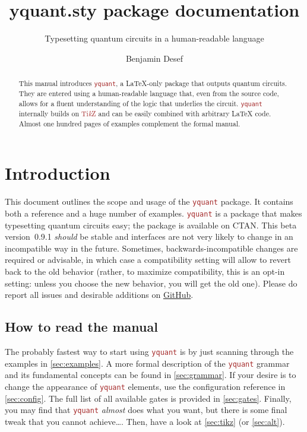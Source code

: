 \documentclass{scrartcl}
\title{yquant.sty package documentation}
\subtitle{Typesetting quantum circuits in a human-readable language}
\author{Benjamin Desef}
\makeatletter
\def\TikZ{\textcolor{brown}{Ti\textit kZ}}
\def\pkg#1{\textcolor{brown}{\texttt{#1}}}
\def\Yquant{\pkg{yquant}}
\newcommand*{\the@orig@section}{}
\let\the@orig@section=\section
\renewcommand*{\section}{%
   \clearpage%
   \the@orig@section%
}
\makeatother
\begin{document}
   \maketitle
   \begin{abstract}
      \noindent This manual introduces \Yquant, a \LaTeX\hyp only package that outputs quantum circuits.
      They are entered using a human\hyp readable language that, even from the source code, allows for a fluent understanding of the logic that underlies the circuit.
      \Yquant{} internally builds on \TikZ{} and can be easily combined with arbitrary \LaTeX{} code.
      Almost one hundred pages of examples complement the formal manual.
   \end{abstract}
   \tableofcontents

   \section{Introduction}
      This document outlines the scope and usage of the \Yquant{} package.
      It contains both a reference and a huge number of examples.
      \Yquant{} is a package that makes typesetting quantum circuits easy; the package is available on CTAN.
      This beta version~0.9.1 \emph{should} be stable and interfaces are not very likely to change in an incompatible way in the future.
      Sometimes, backwards\hyp incompatible changes are required or advisable, in which case a compatibility setting will allow to revert back to the old behavior (rather, to maximize compatibility, this is an opt\hyp in setting: unless you choose the new behavior, you will get the old one).
      Please do report all issues and desirable additions on \href{https://github.com/projekter/yquant/issues}{GitHub}.

      \subsection{How to read the manual}
         The probably fastest way to start using \Yquant{} is by just scanning through the examples in \cref{sec:examples}.
         A more formal description of the \Yquant{} grammar and its fundamental concepts can be found in \cref{sec:grammar}.
         If your desire is to change the appearance of \Yquant{} elements, use the configuration reference in \cref{sec:config}.
         The full list of all available gates is provided in \cref{sec:gates}.
         Finally, you may find that \Yquant{} \emph{almost} does what you want, but there is some final tweak that you cannot achieve\dots.
         Then, have a look at \cref{sec:tikz} (or \cref{sec:alt}).
\end{document}
